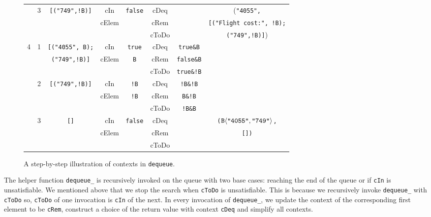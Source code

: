 \begin{figure}[t]
{\begin{center}
\begin{tabular}[c]{ | c | c | c |  c  |  c  |  c | c | c | }
& 3 & \texttt{[("749",!B)]} & cIn & \texttt{false}&  cDeq  &  & (\texttt{"4055",} \\   
\cline{4-7} 
& & & cElem & &  cRem & & \texttt{[("Flight cost:", !B);} \\
\cline{4-7} 
& & &  &  & cToDo &  & \texttt{("749",!B)]})    \\
\hline

\hline
\hline

\hline


4 & 1 & \texttt{[("4055", B);} & cIn & \texttt{true} &  cDeq  & \texttt{true\&B}&  \\   
\cline{4-7} 
& & \texttt{("749",!B)]} & cElem & \texttt{B} &  cRem & \texttt{false\&B} &  \\
\cline{4-7} 
& & &   &  & cToDo &  \texttt{true\&!B}  &      \\

\cline{2-8} 


& 2 & \texttt{[("749",!B)]} & cIn & \texttt{!B} &  cDeq  & \texttt{!B\&!B} &  \\   
\cline{4-7} 
& & & cElem & \texttt{!B} &  cRem & \texttt{B\&!B} &  \\
\cline{4-7} 
& & &  &  & cToDo &   \texttt{!B\&B} &    \\
\cline{2-8} 

& 3 & \texttt{[]} & cIn & \texttt{false} &  cDeq  & & \texttt{($\Chc [\texttt{B}]{\texttt{"4055"}}{\texttt{"749"}}$,}  \\   
\cline{4-7} 
& & & cElem &  &  cRem & & \texttt{[])}  \\
\cline{4-7} 
& & &  &  & cToDo &   &    \\
\hline

\hline

\end{tabular}
\end{center}
}
\caption{A step-by-step illustration of contexts in \texttt{dequeue}.}
\label{fig:pop_table}
\end{figure}

The helper function \texttt{dequeue\_} is recursively invoked on the queue with two base cases: reaching the end of the queue or if \texttt{cIn} is unsatisfiable. We mentioned above that we stop the search when \texttt{cToDo} is unsatisfiable. This is because we recursively invoke \texttt{dequeue\_} with \texttt{cToDo} so, \texttt{cToDo} of one invocation is \texttt{cIn} of the next. In every invocation of \texttt{dequeue\_}, we update the context of the corresponding first element to be \texttt{cRem}, construct a choice of the return value with context \texttt{cDeq} and simplify all contexts.  

